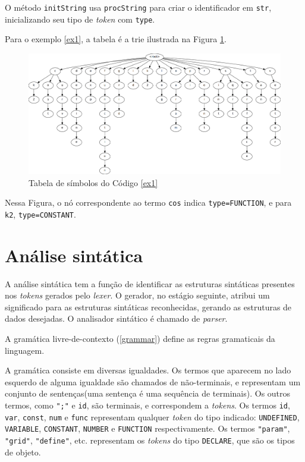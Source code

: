 O método \texttt{initString} usa \texttt{procString}
para criar o identificador em \texttt{str},
inicializando seu tipo de \textit{token} com \texttt{type}.

Para o exemplo \ref{ex1}, a tabela é a trie ilustrada na Figura \ref{img:ex1table}.
\begin{figure}[!ht]
    \includegraphics[width=\linewidth]{ex1table.png}
    \caption{Tabela de símbolos do Código \ref{ex1}}
    \label{img:ex1table}
\end{figure}

Nessa Figura, o nó correspondente ao termo \texttt{cos} indica \texttt{type=FUNCTION},
e para \texttt{k2}, \texttt{type=CONSTANT}.

\section{Análise sintática}
A análise sintática tem a função de identificar as estruturas sintáticas
presentes nos \textit{tokens} gerados pelo \textit{lexer}.
O gerador, no estágio seguinte, atribui um significado para as estruturas
sintáticas reconhecidas, gerando as estruturas de dados desejadas.
O analisador sintático é chamado de \textit{parser}.

\newpage
A gramática livre-de-contexto (\ref{grammar}) define as
regras gramaticais da linguagem.
\lstset{language=}

A gramática consiste em diversas igualdades.
Os termos que aparecem no lado esquerdo de alguma igualdade
são chamados de não-terminais,
e representam um conjunto de sentenças(uma sentença é uma sequência de terminais).
Os outros termos, como \texttt{";"} e \texttt{id}, são terminais,
e correspondem a \textit{tokens}. Os termos \texttt{id}, \texttt{var},
\texttt{const}, \texttt{num}
e \texttt{func} representam qualquer \textit{token} do tipo indicado:
\texttt{UNDEFINED}, \texttt{VARIABLE}, \texttt{CONSTANT},
\texttt{NUMBER} e \texttt{FUNCTION} respectivamente.
Os termos \texttt{"param"}, \texttt{"grid"}, \texttt{"define"}, etc.
representam os \textit{tokens} do tipo \texttt{DECLARE}, que são os tipos de objeto.

